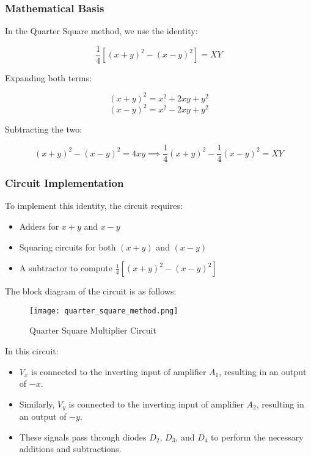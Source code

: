 \subsubsection{Mathematical Basis}

In the Quarter Square method, we use the identity:

\[
\frac{1}{4}[(x + y)^2 - (x - y)^2] = XY
\]

Expanding both terms:

\[
(x + y)^2 = x^2 + 2xy + y^2
\]
\[
(x - y)^2 = x^2 - 2xy + y^2
\]

Subtracting the two:

\[
(x + y)^2 - (x - y)^2 = 4xy \implies \frac{1}{4}(x + y)^2 - \frac{1}{4}(x - y)^2 = XY
\]

\subsubsection{Circuit Implementation}

To implement this identity, the circuit requires:

\begin{itemize}
    \item Adders for \( x + y \) and \( x - y \)
    \item Squaring circuits for both \( (x + y) \) and \( (x - y) \)
    \item A subtractor to compute \( \frac{1}{4}[(x + y)^2 - (x - y)^2] \)
\end{itemize}

The block diagram of the circuit is as follows:

\begin{figure}[h]
    \centering
    \texttt{[image: quarter\_square\_method.png]}
    \caption{Quarter Square Multiplier Circuit}
    \label{fig:quarter_square}
\end{figure}

In this circuit:

\begin{itemize}
    \item \( V_x \) is connected to the inverting input of amplifier \( A_1 \), resulting in an output of \( -x \).
    \item Similarly, \( V_y \) is connected to the inverting input of amplifier \( A_2 \), resulting in an output of \( -y \).
    \item These signals pass through diodes \( D_2 \), \( D_3 \), and \( D_4 \) to perform the necessary additions and subtractions.
\end{itemize}

